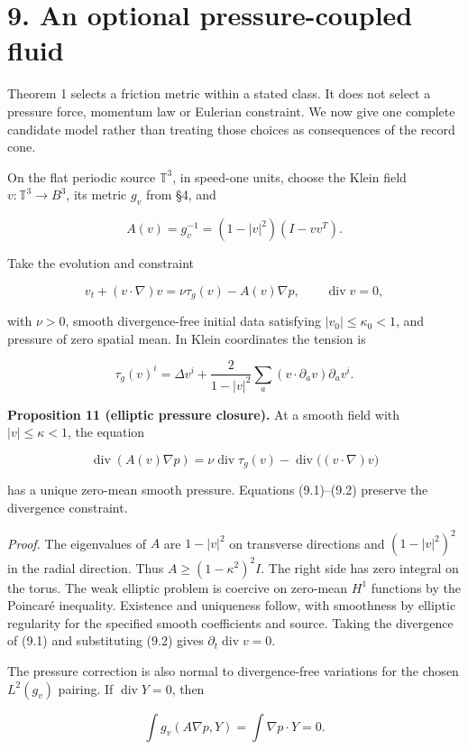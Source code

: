 \documentclass[
  11pt,
  a4paper,
]{article}
\begin{document}
\section{9. An optional pressure-coupled fluid}\label{an-optional-pressure-coupled-fluid}

Theorem 1 selects a friction metric within a stated class. It does not select a pressure force, momentum law or Eulerian constraint. We now give one complete candidate model rather than treating those choices as consequences of the record cone.

On the flat periodic source \(\mathbb T^3\), in speed-one units, choose the Klein field \(v:\mathbb T^3\to B^3\), its metric \(g_v\) from §4, and

\[
A(v)=g_v^{-1}=(1-|v|^2)(I-vv^T).
\]

Take the evolution and constraint

\[
v_t+(v\cdot\nabla)v=\nu\tau_g(v)-A(v)\nabla p,
\qquad \operatorname{div}v=0,
\tag{9.1}
\]

with \(\nu>0\), smooth divergence-free initial data satisfying \(|v_0|\leq\kappa_0<1\), and pressure of zero spatial mean. In Klein coordinates the tension is

\[
\tau_g(v)^i=\Delta v^i+
\frac{2}{1-|v|^2}\sum_a(v\cdot\partial_a v)\partial_a v^i.
\]

\textbf{Proposition 11 (elliptic pressure closure).} At a smooth field with \(|v|\leq\kappa<1\), the equation

\[
\operatorname{div}(A(v)\nabla p)
=\nu\operatorname{div}\tau_g(v)
-\operatorname{div}\big((v\cdot\nabla)v\big)
\tag{9.2}
\]

has a unique zero-mean smooth pressure. Equations (9.1)--(9.2) preserve the divergence constraint.

\emph{Proof.} The eigenvalues of \(A\) are \(1-|v|^2\) on transverse directions and \((1-|v|^2)^2\) in the radial direction. Thus \(A\geq(1-\kappa^2)^2I\). The right side has zero integral on the torus. The weak elliptic problem is coercive on zero-mean \(H^1\) functions by the Poincaré inequality. Existence and uniqueness follow, with smoothness by elliptic regularity for the specified smooth coefficients and source. Taking the divergence of (9.1) and substituting (9.2) gives \(\partial_t\operatorname{div}v=0\).

The pressure correction is also normal to divergence-free variations for the chosen \(L^2(g_v)\) pairing. If \(\operatorname{div}Y=0\), then

\[
\int g_v(A\nabla p,Y)=\int\nabla p\cdot Y=0.
\]
\end{document}
